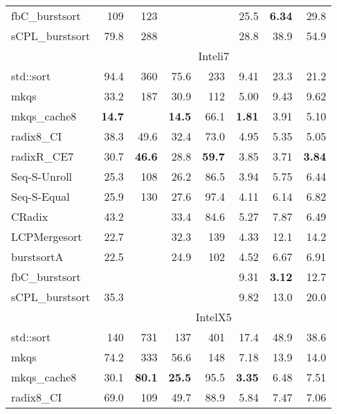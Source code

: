 \documentclass[a4paper]{myjournal}
\begin{document}
\begin{table}[p]
\begin{tabular}{l|rrrr rrr|}
  fbC\_burstsort &      109 &     123 &          &         &     25.5 & \bf 6.34 &     29.8 \\
 sCPL\_burstsort &     79.8 &     288 &          &         &     28.8 &     38.9 &     54.9 \\ \hline
& \multicolumn{7}{c|}{Inteli7} \\ \cline{2-8}
std::sort &     94.4 &      360 &     75.6 &      233 &     9.41 &     23.3 &     21.2 \\
            mkqs &     33.2 &      187 &     30.9 &      112 &     5.00 &     9.43 &     9.62 \\
    mkqs\_cache8 & \bf 14.7 &          & \bf 14.5 &     66.1 & \bf 1.81 &     3.91 &     5.10 \\
      radix8\_CI &     38.3 &     49.6 &     32.4 &     73.0 &     4.95 &     5.35 &     5.05 \\
     radixR\_CE7 &     30.7 & \bf 46.6 &     28.8 & \bf 59.7 &     3.85 &     3.71 & \bf 3.84 \\
Seq-S-Unroll &     25.3 &      108 &     26.2 &     86.5 &     3.94 &     5.75 &     6.44 \\
 Seq-S-Equal &     25.9 &      130 &     27.6 &     97.4 &     4.11 &     6.14 &     6.82 \\
          CRadix &     43.2 &          &     33.4 &     84.6 &     5.27 &     7.87 &     6.49 \\
    LCPMergesort &     22.7 &          &     32.3 &      139 &     4.33 &     12.1 &     14.2 \\
      burstsortA &     22.5 &          &     24.9 &      102 &     4.52 &     6.67 &     6.91 \\
  fbC\_burstsort &          &          &          &          &     9.31 & \bf 3.12 &     12.7 \\
 sCPL\_burstsort &     35.3 &          &          &          &     9.82 &     13.0 &     20.0 \\ \hline
& \multicolumn{7}{c|}{IntelX5} \\ \cline{2-8}
std::sort &      140 &      731 &      137 &      401 &     17.4 &     48.9 &     38.6 \\
            mkqs &     74.2 &      333 &     56.6 &      148 &     7.18 &     13.9 &     14.0 \\
    mkqs\_cache8 &     30.1 & \bf 80.1 & \bf 25.5 &     95.5 & \bf 3.35 &     6.48 &     7.51 \\
      radix8\_CI &     69.0 &      109 &     49.7 &     88.9 &     5.84 &     7.47 &     7.06 \\

\end{tabular}
\end{table}
\end{document}
